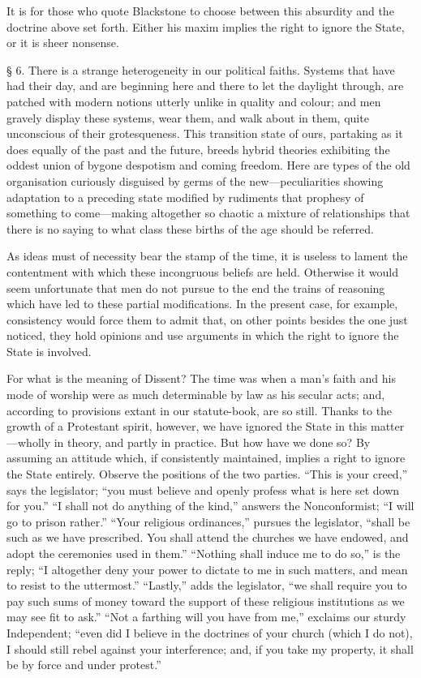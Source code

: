 \documentclass[oneside]{book}
\begin{document}
It is for those who quote Blackstone to choose between this
\newpage\noindent
absurdity and the doctrine above set forth. Either his maxim
implies the right to ignore the State, or it is sheer nonsense.


\S{} 6. There is a strange heterogeneity in our political
faiths. Systems that have had their day, and are beginning
here and there to let the daylight through, are patched with
modern notions utterly unlike in quality and colour; and men
gravely display these systems, wear them, and walk about in
them, quite unconscious of their grotesqueness. This transition
state of ours, partaking as it does equally of the past and the
future, breeds hybrid theories exhibiting the oddest union of
bygone despotism and coming freedom. Here are types of the
old organisation curiously disguised by germs of the new---peculiarities
showing adaptation to a preceding state modified
by rudiments that prophesy of something to come---making
altogether so chaotic a mixture of relationships that there is no
saying to what class these births of the age should be referred.

As ideas must of necessity bear the stamp of the time, it
is useless to lament the contentment with which these incongruous
beliefs are held. Otherwise it would seem unfortunate
that men do not pursue to the end the trains of reasoning
which have led to these partial modifications. In the present
case, for example, consistency would force them to admit that, on
other points besides the one just noticed, they hold opinions and
use arguments in which the right to ignore the State is involved.

For what is the meaning of Dissent? The time was when
a man's faith and his mode of worship were as much determinable
by law as his secular acts; and, according to provisions
extant in our statute-book, are so still. Thanks to the growth
of a Protestant spirit, however, we have ignored the State in
this matter---wholly in theory, and partly in practice. But how
have we done so? By assuming an attitude which, if consistently
maintained, implies a right to ignore the State entirely.
Observe the positions of the two parties. ``This is your creed,''
says the legislator; ``you must believe and openly profess what
is here set down for you.'' ``I shall not do anything of the
kind,'' answers the Nonconformist; ``I will go to prison rather.''
\newpage\noindent
``Your religious ordinances,'' pursues the legislator, ``shall be
such as we have prescribed. You shall attend the churches
we have endowed, and adopt the ceremonies used in them.''
``Nothing shall induce me to do so,'' is the reply; ``I altogether
deny your power to dictate to me in such matters, and mean
to resist to the uttermost.'' ``Lastly,'' adds the legislator, ``we
shall require you to pay such sums of money toward the support
of these religious institutions as we may see fit to ask.'' ``Not
a farthing will you have from me,'' exclaims our sturdy Independent;
``even did I believe in the doctrines of your church
(which I do not), I should still rebel against your interference;
and, if you take my property, it shall be by force and under
protest.''
\end{document}
